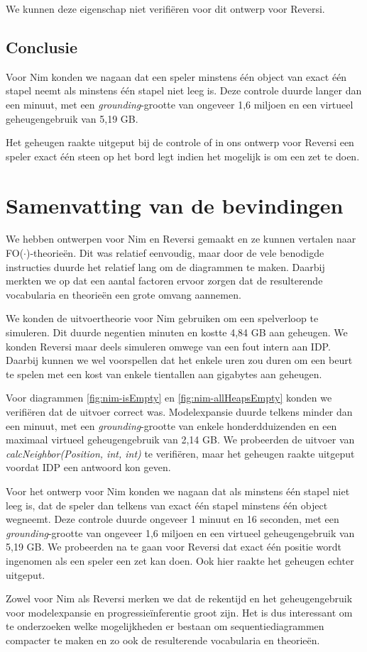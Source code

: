 We kunnen deze eigenschap niet verifi\"eren voor dit ontwerp voor Reversi.

\subsection{Conclusie}

Voor Nim konden we nagaan dat een speler minstens \'e\'en object van exact \'e\'en stapel neemt als minstens \'e\'en stapel niet leeg is. Deze controle duurde langer dan een minuut, met een \textit{grounding}-grootte van ongeveer 1,6 miljoen en een virtueel geheugengebruik van 5,19 GB.

Het geheugen raakte uitgeput bij de controle of in ons ontwerp voor Reversi een speler exact \'e\'en steen op het bord legt indien het mogelijk is om een zet te doen.

\section{Samenvatting van de bevindingen}
We hebben ontwerpen voor Nim en Reversi gemaakt en ze kunnen vertalen naar FO($\cdot$)-theorie\"en. Dit was relatief eenvoudig, maar door de vele benodigde instructies duurde het relatief lang om de diagrammen te maken. Daarbij merkten we op dat een aantal factoren ervoor zorgen dat de resulterende vocabularia en theorie\"en een grote omvang aannemen.

We konden de uitvoertheorie voor Nim gebruiken om een spelverloop te simuleren. Dit duurde negentien minuten en kostte 4,84 GB aan geheugen. We konden Reversi maar deels simuleren omwege van een fout intern aan IDP. Daarbij kunnen we wel voorspellen dat het enkele uren zou duren om een beurt te spelen met een kost van enkele tientallen aan gigabytes aan geheugen.

Voor diagrammen \ref{fig:nim-isEmpty} en \ref{fig:nim-allHeapsEmpty} konden we verifi\"eren dat de uitvoer correct was. Modelexpansie duurde telkens minder dan een minuut, met een \textit{grounding}-grootte van enkele honderdduizenden en een maximaal virtueel geheugengebruik van 2,14 GB. We probeerden de uitvoer van \textit{calcNeighbor(Position, int, int)} te verifi\"eren, maar het geheugen raakte uitgeput voordat IDP een antwoord kon geven.

Voor het ontwerp voor Nim konden we nagaan dat als minstens \'e\'en stapel niet leeg is, dat de speler dan telkens van exact \'e\'en stapel minstens \'e\'en object wegneemt. Deze controle duurde ongeveer 1 minuut en 16 seconden, met een \textit{grounding}-grootte van ongeveer 1,6 miljoen en een virtueel geheugengebruik van 5,19 GB. We probeerden na te gaan voor Reversi dat exact \'e\'en positie wordt ingenomen als een speler een zet kan doen. Ook hier raakte het geheugen echter uitgeput.

Zowel voor Nim als Reversi merken we dat de rekentijd en het geheugengebruik voor modelexpansie en progressie\"inferentie groot zijn. Het is dus interessant om te onderzoeken welke mogelijkheden er bestaan om sequentiediagrammen compacter te maken en zo ook de resulterende vocabularia en theorie\"en.